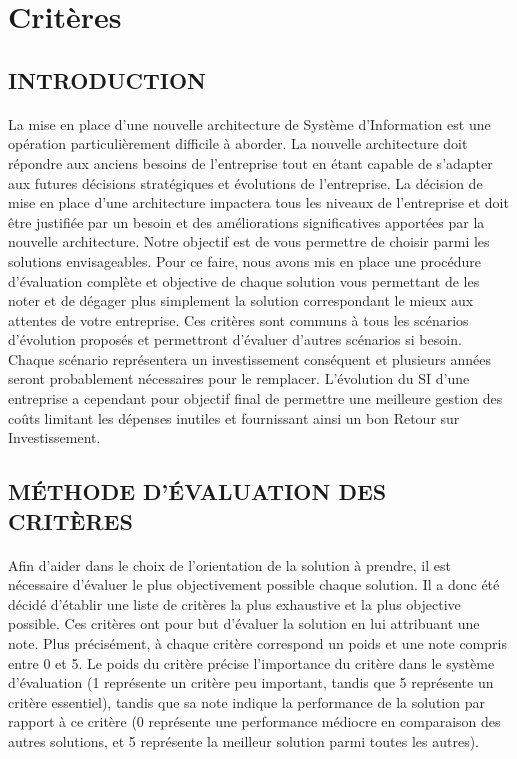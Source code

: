 \section{Critères}
\subsection{INTRODUCTION}

\paragraph{} La mise en place d'une nouvelle architecture de Système d'Information est une opération particulièrement difficile à aborder. La nouvelle architecture doit répondre aux anciens besoins de l'entreprise tout en étant capable de s'adapter aux futures décisions stratégiques et évolutions de l'entreprise. La décision de mise en place d'une architecture impactera tous les niveaux de l'entreprise et doit être justifiée par un besoin et des améliorations significatives apportées par la nouvelle architecture. Notre objectif est de vous permettre de choisir parmi les solutions envisageables. Pour ce faire, nous avons mis en place une procédure d'évaluation complète et objective de chaque solution vous permettant de les noter et de dégager plus simplement la solution correspondant le mieux aux attentes de votre entreprise. Ces critères sont communs à tous les scénarios d'évolution proposés et permettront d'évaluer d'autres scénarios si besoin. Chaque scénario représentera un investissement conséquent et plusieurs années seront probablement nécessaires pour le remplacer. L'évolution du SI d'une entreprise a cependant pour objectif final de permettre une meilleure gestion des coûts limitant les dépenses inutiles et fournissant ainsi un bon Retour sur Investissement.

\subsection{MÉTHODE D'ÉVALUATION DES CRITÈRES}


\paragraph{} Afin d'aider dans le choix de l'orientation de la solution à prendre, il est nécessaire d'évaluer le plus objectivement possible chaque solution.
Il a donc été décidé d'établir une liste de critères la plus exhaustive et la plus objective possible.
Ces critères ont pour but d'évaluer la solution en lui attribuant une note. Plus précisément, à chaque critère correspond un poids et une note compris entre 0 et 5. Le poids du critère précise l'importance du critère dans le système d'évaluation (1 représente un critère peu important, tandis que 5 représente un critère essentiel), tandis que sa note indique la performance de la solution par rapport à ce critère (0 représente une performance médiocre en comparaison des autres solutions, et 5 représente la meilleur solution parmi toutes les autres).

